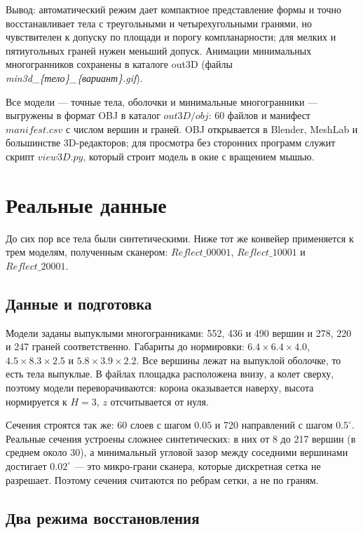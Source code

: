 \documentclass[12pt, a4paper]{article}
\begin{document}
Вывод: автоматический режим дает компактное представление формы и точно восстанавливает тела с треугольными и четырехугольными гранями, но чувствителен к допуску по площади и порогу компланарности; для мелких и пятиугольных граней нужен меньший допуск. Анимации минимальных многогранников сохранены в каталоге out3D (файлы \textit{min3d\_\{тело\}\_\{вариант\}.gif}).

Все модели --- точные тела, оболочки и минимальные многогранники --- выгружены в формат OBJ в каталог $out3D/obj$: 60 файлов и манифест $manifest.csv$ с числом вершин и граней. OBJ открывается в Blender, MeshLab и большинстве 3D-редакторов; для просмотра без сторонних программ служит скрипт $view3D.py$, который строит модель в окне с вращением мышью.

\clearpage
\section{Реальные данные}

До сих пор все тела были синтетическими. Ниже тот же конвейер применяется к трем моделям, полученным сканером: $Reflect\_00001$, $Reflect\_10001$ и $Reflect\_20001$.

\subsection{Данные и подготовка}

Модели заданы выпуклыми многогранниками: 552, 436 и 490 вершин и 278, 220 и 247 граней соответственно. Габариты до нормировки: $6.4\times 6.4\times 4.0$, $4.5\times 8.3\times 2.5$ и $5.8\times 3.9\times 2.2$. Все вершины лежат на выпуклой оболочке, то есть тела выпуклые. В файлах площадка расположена внизу, а колет сверху, поэтому модели переворачиваются: корона оказывается наверху, высота нормируется к $H=3$, $z$ отсчитывается от нуля.

Сечения строятся так же: 60 слоев с шагом $0.05$ и 720 направлений с шагом $0.5^\circ$. Реальные сечения устроены сложнее синтетических: в них от 8 до 217 вершин (в среднем около 30), а минимальный угловой зазор между соседними вершинами достигает $0.02^\circ$ --- это микро-грани сканера, которые дискретная сетка не разрешает. Поэтому сечения считаются по ребрам сетки, а не по граням.

\subsection{Два режима восстановления}
\end{document}
